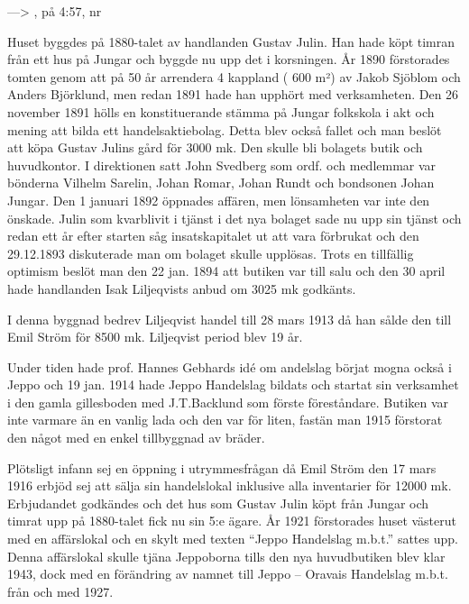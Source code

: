 ---> , på 4:57, nr 



Huset byggdes på 1880-talet av handlanden Gustav Julin. Han hade köpt timran från ett hus på Jungar och byggde nu upp det i korsningen. År 1890 förstorades tomten genom att på 50 år arrendera 4 kappland ( 600 m²) av Jakob Sjöblom och Anders Björklund, men redan 1891 hade han upphört med verksamheten. Den 26 november 1891 hölls en konstituerande stämma på Jungar folkskola i akt och mening att bilda ett handelsaktiebolag. Detta blev också fallet och man beslöt att köpa Gustav Julins gård för 3000 mk. Den skulle bli bolagets  butik  och huvudkontor. I direktionen satt John Svedberg som ordf. och medlemmar var bönderna Vilhelm Sarelin, Johan Romar, Johan Rundt och bondsonen Johan Jungar. Den 1 januari 1892 öppnades affären, men lönsamheten var inte den önskade. Julin som kvarblivit i tjänst i det nya bolaget sade nu upp sin tjänst och redan ett år efter starten såg insatskapitalet ut att vara förbrukat och den 29.12.1893 diskuterade man om bolaget skulle upplösas. Trots en tillfällig optimism beslöt man den 22 jan. 1894 att butiken var till salu och den 30 april hade handlanden Isak Liljeqvists anbud om 3025 mk godkänts.

I denna byggnad bedrev Liljeqvist handel till 28 mars 1913 då han sålde den till Emil Ström för 8500 mk. Liljeqvist period blev 19 år.

Under tiden hade prof. Hannes Gebhards idé om andelslag börjat mogna också i Jeppo och 19 jan. 1914 hade Jeppo Handelslag bildats och startat sin verksamhet i den gamla gillesboden med J.T.Backlund som förste föreståndare. Butiken var inte varmare än en vanlig lada och den var för liten, fastän man 1915 förstorat den något med en enkel tillbyggnad av bräder.

Plötsligt infann sej en öppning i utrymmesfrågan då Emil Ström den 17 mars 1916 erbjöd sej att sälja sin handelslokal inklusive alla inventarier för 12000 mk. Erbjudandet godkändes och det hus som Gustav Julin köpt från Jungar och timrat upp på 1880-talet fick nu sin 5:e ägare. År 1921 förstorades huset västerut med en affärslokal och en skylt med texten ``Jeppo Handelslag m.b.t.'' sattes upp. Denna affärslokal skulle tjäna Jeppoborna tills den nya huvudbutiken blev klar 1943, dock med en förändring av namnet till Jeppo – Oravais Handelslag m.b.t. från och med  1927.

